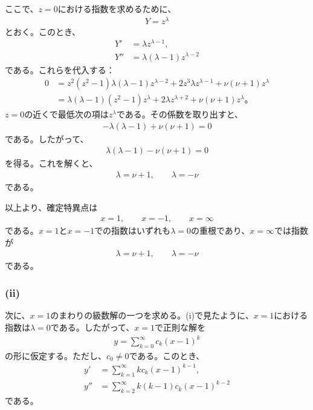 \documentclass[platex,dvipdfmx,a4paper]{jsarticle}
\newcommand{\ssum}[3]{\sum_{#1=#2}^#3}
\begin{document}
  ここで、$z=0$における指数を求めるために、
  \begin{align*}
    Y=z^\lambda
  \end{align*}
  とおく。このとき、
  \begin{align*}
    Y'&=\lambda z^{\lambda-1},\\
    Y''&=\lambda(\lambda-1)z^{\lambda-2}
  \end{align*}
  である。これらを代入する：
  \begin{align*}
    0
    &=
    z^2(z^2-1)\lambda(\lambda-1)z^{\lambda-2}
    +2z^3\lambda z^{\lambda-1}
    +\nu(\nu+1)z^\lambda \\
    &=
    \lambda(\lambda-1)(z^2-1)z^\lambda
    +2\lambda z^{\lambda+2}
    +\nu(\nu+1)z^\lambda。
  \end{align*}
  $z=0$の近くで最低次の項は$z^\lambda$である。その係数を取り出すと、
  \begin{align*}
    -\lambda(\lambda-1)+\nu(\nu+1)=0
  \end{align*}
  である。したがって、
  \begin{align*}
    \lambda(\lambda-1)-\nu(\nu+1)=0
  \end{align*}
  を得る。これを解くと、
  \begin{align*}
    \lambda=\nu+1,\qquad \lambda=-\nu
  \end{align*}
  である。
  
  以上より、確定特異点は
  \begin{align*}
    x=1,\qquad x=-1,\qquad x=\infty
  \end{align*}
  である。$x=1$と$x=-1$での指数はいずれも$\lambda=0$の重根であり、$x=\infty$では指数が
  \begin{align*}
    \lambda=\nu+1,\qquad \lambda=-\nu
  \end{align*}
  である。


  \subsubsection*{(ii)}

  次に、$x=1$のまわりの級数解の一つを求める。(i)で見たように、$x=1$における指数は$\lambda=0$である。したがって、$x=1$で正則な解を
  \begin{align*}
    y=\ssum{k}{0}{\infty}c_k(x-1)^k
  \end{align*}
  の形に仮定する。ただし、$c_0\neq0$である。このとき、
  \begin{align*}
    y'
    &=\ssum{k}{1}{\infty}kc_k(x-1)^{k-1},\\
    y''
    &=\ssum{k}{2}{\infty}k(k-1)c_k(x-1)^{k-2}
  \end{align*}
  である。
  
\end{document}
